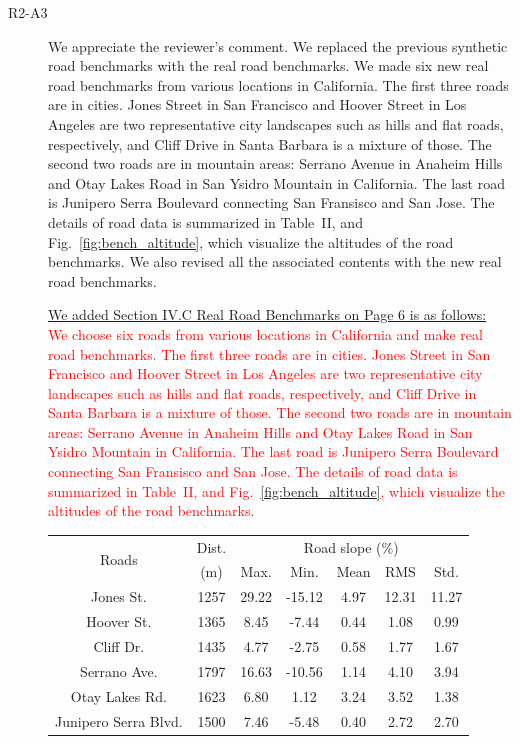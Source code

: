 \documentclass[onecolumn]{IEEEconf}
\begin{document}
\begin{description}
\item [R2-A3] We appreciate the reviewer's comment. We replaced the previous synthetic road benchmarks with the real road benchmarks. We made six new real road benchmarks from various locations in California.  The first three roads are in cities. Jones Street in San Francisco and Hoover Street in Los Angeles are two representative city landscapes such as hills and flat roads, respectively, and Cliff Drive in Santa Barbara is a mixture of those. The second two roads are in mountain areas: Serrano Avenue in Anaheim Hills and Otay Lakes Road in San Ysidro Mountain in California. The last road is Junipero Serra Boulevard connecting San Fransisco and San Jose. The details of road data is summarized in Table~II, and Fig.~\ref{fig:bench_altitude}, which visualize the altitudes of the road benchmarks. We also revised all the associated contents with the new real road benchmarks. 

\uline{We added Section IV.C Real Road Benchmarks on Page 6 is as follows:}\\
\textcolor{red}{We choose six  roads from various locations in California and make real road benchmarks. The first three roads are in cities. Jones Street in San Francisco and Hoover Street in Los Angeles are two representative city landscapes such as hills and flat roads, respectively, and Cliff Drive in Santa Barbara is a mixture of those. The second two roads are in mountain areas: Serrano Avenue in Anaheim Hills and Otay Lakes Road in San Ysidro Mountain in California. The last road is Junipero Serra Boulevard connecting San Fransisco and San Jose. The details of road data is summarized in Table~II, and Fig.~\ref{fig:bench_altitude}, which visualize the altitudes of the road benchmarks.}



\begin{table} [h!]
\centering
\label{table:road_bench}
\begin{tabular}{|c|c|c|c|c|c|c|}  \hline
\multirow{2}{*}{Roads} 
				&Dist.		&\multicolumn{5}{|c|}{Road slope (\%)}  \\ \cline{3-7}
				&(m)		 	&Max.		&Min. 	&Mean		&RMS 	&Std.	\\ \hline
Jones St. 	&1257		&29.22		&-15.12	&4.97 		&12.31 	&11.27	\\ \hline
Hoover St. 	&1365		&8.45		&-7.44	&0.44		&1.08 	&0.99	\\ \hline
Cliff Dr. 	&1435		&4.77		&-2.75	&0.58		&1.77 	&1.67	\\ \hline
Serrano Ave.		&1797		&16.63		&-10.56	&1.14 		&4.10 	&3.94	\\ \hline
Otay Lakes Rd.		&1623		&6.80		&1.12	&3.24		&3.52 	&1.38	\\ \hline
Junipero Serra Blvd.	&1500		&7.46		&-5.48	&0.40		&2.72 	&2.70	\\ \hline
\end{tabular}
\end{table}



\end{description}
\end{document}
